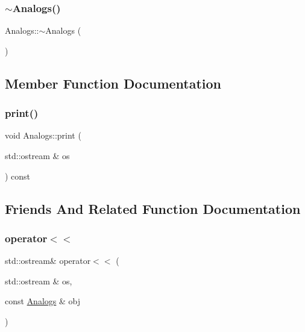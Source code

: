 \mbox{\label{class_analogs_ae6de501f002f0a3c878d44d5c7b67a0d}} 
\subsubsection{\texorpdfstring{$\sim$\+Analogs()}{~Analogs()}}
{\footnotesize\ttfamily Analogs\+::$\sim$\+Analogs (\begin{DoxyParamCaption}{ }\end{DoxyParamCaption})\hspace{0.3cm}{\ttfamily [virtual]}}



\subsection{Member Function Documentation}
\mbox{\label{class_analogs_a8ed3949305fc98471e987ae03c305c17}} 
\subsubsection{\texorpdfstring{print()}{print()}}
{\footnotesize\ttfamily void Analogs\+::print (\begin{DoxyParamCaption}\item[{std\+::ostream \&}]{os }\end{DoxyParamCaption}) const}



\subsection{Friends And Related Function Documentation}
\mbox{\label{class_analogs_a8b1c62cad49a019ac1733168d179cf73}} 
\subsubsection{\texorpdfstring{operator$<$$<$}{operator<<}}
{\footnotesize\ttfamily std\+::ostream\& operator$<$$<$ (\begin{DoxyParamCaption}\item[{std\+::ostream \&}]{os,  }\item[{const \mbox{\hyperlink{class_analogs}{Analogs}} \&}]{obj }\end{DoxyParamCaption})\hspace{0.3cm}{\ttfamily [friend]}}



